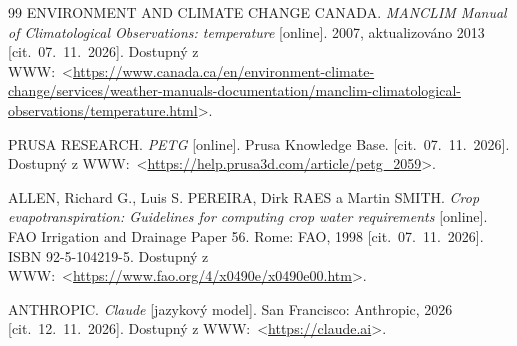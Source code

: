 \documentclass[oneside]{ctuthesis}
\theoremstyle{plain}
\theoremstyle{definition}
\theoremstyle{note}
\begin{document}
\begin{thebibliography}{99}
 ENVIRONMENT AND CLIMATE CHANGE CANADA. \textit{MANCLIM Manual of Climatological Observations: temperature} [online]. 2007, aktualizováno 2013 [cit.~07.~11.~2026]. Dostupný z WWW:~<\url{https://www.canada.ca/en/environment-climate-change/services/weather-manuals-documentation/manclim-climatological-observations/temperature.html}>.

 PRUSA RESEARCH. \textit{PETG} [online]. Prusa Knowledge Base. [cit.~07.~11.~2026]. Dostupný z WWW:~<\url{https://help.prusa3d.com/article/petg_2059}>.

 ALLEN, Richard G., Luis S. PEREIRA, Dirk RAES a Martin SMITH. \textit{Crop evapotranspiration: Guidelines for computing crop water requirements} [online]. FAO Irrigation and Drainage Paper 56. Rome: FAO, 1998 [cit.~07.~11.~2026]. ISBN 92-5-104219-5. Dostupný z WWW:~<\url{https://www.fao.org/4/x0490e/x0490e00.htm}>.

 ANTHROPIC. \textit{Claude} [jazykový model]. San Francisco: Anthropic, 2026 [cit.~12.~11.~2026]. Dostupný z WWW:~<\url{https://claude.ai}>.

\end{thebibliography}
\end{document}
